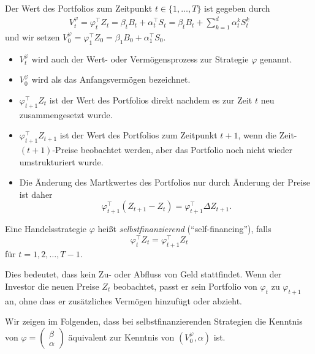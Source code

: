 \documentclass[a4paper,twoside,DIV15,BCOR12mm]{scrbook}
\begin{document}
\begin{definition}
\label{def:2.3.2}Der Wert des Portfolios zum Zeitpunkt $t\in\{1,\ldots,T\}$ ist gegeben durch 
\begin{align*}
V_t^\varphi  = \varphi_t^\top Z_t = \beta_t B_t + \alpha_t^\top S_t = \beta_tB_t + \sum_{k=1}^d \alpha_t^kS_t^k
\end{align*}
und wir setzen $V_0^\varphi = \varphi_1^\top Z_0 = \beta_1B_0 + \alpha_1^\top S_0$.
\end{definition}

\begin{bemerkung}
\begin{itemize}
\item $V_t^\varphi$ wird auch der Wert- oder Vermögensprozess zur Strategie $\varphi$ genannt.
\item $V_0^\varphi$ wird als das Anfangsvermögen bezeichnet.
\item $\varphi_{t+1}^\top Z_t$ ist der Wert des Portfolios direkt nachdem es zur Zeit $t$ neu zusammengesetzt wurde.
\item $\varphi_{t+1}^\top Z_{t+1}$ ist der Wert des Portfolios zum Zeitpunkt $t+1$, wenn die Zeit-$(t+1)$-Preise beobachtet werden, aber das Portfolio noch nicht wieder umstrukturiert wurde.
\item Die Änderung des Martkwertes des Portfolios nur durch Änderung der Preise ist daher
\[
\varphi_{t+1}^\top (Z_{t+1}-Z_t) = \varphi_{t+1}^\top \Delta Z_{t+1}.
\]
\end{itemize}
\end{bemerkung}

\begin{definition}
Eine Handelsstrategie $\varphi$ heißt \emph{selbstfinanzierend} (“self-financing”), falls
\[
\varphi_t^\top Z_t = \varphi_{t+1}^\top Z_t
\]
für $t=1, 2,\ldots,T-1$.
\end{definition}

Dies bedeutet, dass kein Zu- oder Abfluss von Geld stattfindet. Wenn der Investor die neuen Preise $Z_t$ beobachtet, passt er sein Portfolio von $\varphi_t$ zu $\varphi_{t+1}$ an, ohne dass er zusätzliches Vermögen hinzufügt oder abzieht.

Wir zeigen im Folgenden, dass bei selbstfinanzierenden Strategien die Kenntnis von $\varphi 
=\left(\begin{smallmatrix}
\beta \\ \alpha
\end{smallmatrix}\right)$
äquivalent zur Kenntnis von $(V_0^\varphi, \alpha)$ ist.
\end{document}
